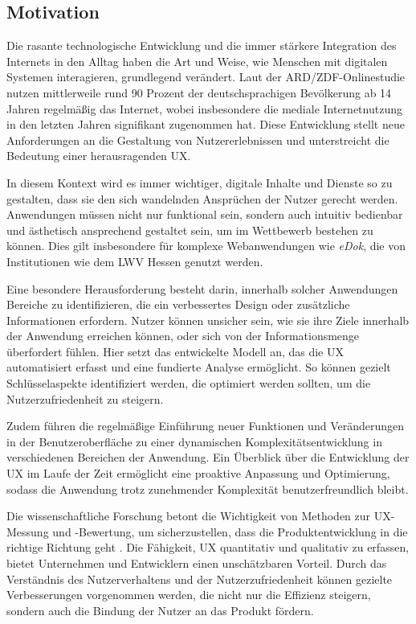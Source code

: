 \documentclass[12pt,oneside]{article}
\begin{document}
\subsection{Motivation}

Die rasante technologische Entwicklung und die immer stärkere Integration des Internets in den Alltag haben die Art und Weise, wie Menschen mit digitalen Systemen interagieren, grundlegend verändert. Laut der ARD/ZDF-Onlinestudie \cite{ard} nutzen mittlerweile rund 90 Prozent der deutschsprachigen Bevölkerung ab 14 Jahren regelmäßig das Internet, wobei insbesondere die mediale Internetnutzung in den letzten Jahren signifikant zugenommen hat. Diese Entwicklung stellt neue Anforderungen an die Gestaltung von Nutzererlebnissen und unterstreicht die Bedeutung einer herausragenden UX.

In diesem Kontext wird es immer wichtiger, digitale Inhalte und Dienste so zu gestalten, dass sie den sich wandelnden Ansprüchen der Nutzer gerecht werden. Anwendungen müssen nicht nur funktional sein, sondern auch intuitiv bedienbar und ästhetisch ansprechend gestaltet sein, um im Wettbewerb bestehen zu können. Dies gilt insbesondere für komplexe Webanwendungen wie \textit{eDok}, die von Institutionen wie dem LWV Hessen genutzt werden.

Eine besondere Herausforderung besteht darin, innerhalb solcher Anwendungen Bereiche zu identifizieren, die ein verbessertes Design oder zusätzliche Informationen erfordern. Nutzer können unsicher sein, wie sie ihre Ziele innerhalb der Anwendung erreichen können, oder sich von der Informationsmenge überfordert fühlen. Hier setzt das entwickelte Modell an, das die UX automatisiert erfasst und eine fundierte Analyse ermöglicht. So können gezielt Schlüsselaspekte identifiziert werden, die optimiert werden sollten, um die Nutzerzufriedenheit zu steigern.

Zudem führen die regelmäßige Einführung neuer Funktionen und Veränderungen in der Benutzeroberfläche zu einer dynamischen Komplexitätsentwicklung in verschiedenen Bereichen der Anwendung. Ein Überblick über die Entwicklung der UX im Laufe der Zeit ermöglicht eine proaktive Anpassung und Optimierung, sodass die Anwendung trotz zunehmender Komplexität benutzerfreundlich bleibt.

Die wissenschaftliche Forschung betont die Wichtigkeit von Methoden zur UX-Messung und -Bewertung, um sicherzustellen, dass die Produktentwicklung in die richtige Richtung geht \cite{Virpi}. Die Fähigkeit, UX quantitativ und qualitativ zu erfassen, bietet Unternehmen und Entwicklern einen unschätzbaren Vorteil. Durch das Verständnis des Nutzerverhaltens und der Nutzerzufriedenheit können gezielte Verbesserungen vorgenommen werden, die nicht nur die Effizienz steigern, sondern auch die Bindung der Nutzer an das Produkt fördern.
\end{document}
